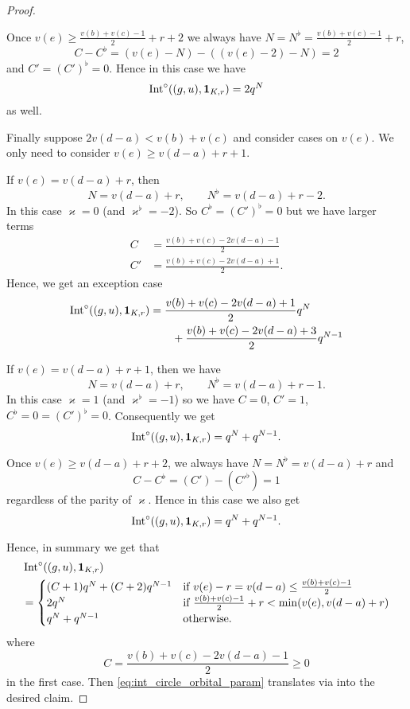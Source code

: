 \begin{proof}
\begin{itemize}
\begin{itemize}
      \ii Once $v(e) \ge \frac{v(b)+v(c)-1}{2} + r + 2$
      we always have $N = N^\flat = \frac{v(b)+v(c)-1}{2} + r$,
      \[ C - C^\flat = (v(e)-N)-((v(e)-2)-N) = 2 \]
      and $C' = (C')^\flat = 0$.
      Hence in this case we have
      \[ \operatorname{Int}^\circ((g,u), \mathbf{1}_{K, r}) = 2 q^N \]
      as well.
    \end{itemize}

    \ii Finally suppose $2v(d-a) < v(b) + v(c)$ and consider cases on $v(e)$.
    We only need to consider $v(e) \ge v(d-a) + r + 1$.
    \begin{itemize}
      \ii If $v(e) = v(d-a) + r$,
      then \[ N = v(d-a) + r, \qquad N^\flat = v(d-a) + r - 2. \]
      In this case $\varkappa = 0$ (and $\varkappa^\flat=-2$).
      So $C^\flat = (C')^\flat = 0$ but we have larger terms
      \begin{align*}
        C &= \frac{v(b) + v(c)- 2v(d-a) - 1}{2} \\
        C' &= \frac{v(b) + v(c)- 2v(d-a) + 1}{2}.
      \end{align*}
      Hence, we get an exception case
      \begin{align*}
        \operatorname{Int}^\circ((g,u), \mathbf{1}_{K, r})
        &= \frac{v(b) + v(c) - 2v(d-a) + 1}{2} q^{N} \\
        &\qquad+ \frac{v(b) + v(c) - 2v(d-a) + 3}{2} q^{N-1}
      \end{align*}

      \ii If $v(e) = v(d-a) + r + 1$,
      then we have
      \[ N = v(d-a) + r, \qquad N^\flat = v(d-a) + r - 1. \]
      In this case $\varkappa = 1$ (and $\varkappa^\flat=-1$) so we have
      $C = 0$, $C' = 1$, $C^\flat = 0 = (C')^\flat = 0$.
      Consequently we get
      \[ \operatorname{Int}^\circ((g,u), \mathbf{1}_{K, r}) = q^{N} + q^{N-1}. \]

      \ii Once $v(e) \ge v(d-a) + r + 2$,
      we always have $N = N^\flat = v(d-a) + r$ and
      \[ C - C^\flat = (C') - (C'^\flat) = 1 \]
      regardless of the parity of $\varkappa$.
      Hence in this case we also get
      \[ \operatorname{Int}^\circ((g,u), \mathbf{1}_{K, r}) = q^{N} + q^{N-1}. \]
    \end{itemize}
  \end{itemize}
  Hence, in summary we get that
  \begin{equation}
  \begin{aligned}
    &\operatorname{Int}^\circ((g,u), \mathbf{1}_{K, r}) \\
    &= \begin{cases}
      (C+1) q^{N} + (C+2) q^{N-1}
        & \text{if } v(e)-r = v(d-a) \le \frac{v(b)+v(c)-1}{2} \\
      2q^N & \text{if } \frac{v(b)+v(c)-1}{2} + r < \min(v(e), v(d-a)+r) \\
      q^N + q^{N-1} & \text{otherwise}.
    \end{cases}
  \end{aligned}
  \label{eq:int_circle_orbital_param}
  \end{equation}
  where
  \[ C = \frac{v(b) + v(c)- 2v(d-a) - 1}{2} \ge 0 \]
  in the first case.
  Then \eqref{eq:int_circle_orbital_param} translates via
   into the desired claim.
\end{proof}
